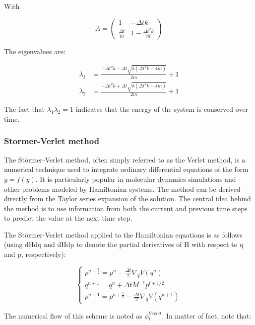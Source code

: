 \documentclass{article}
\begin{document}
With

\[
	A = \begin{pmatrix} 1 & -\Delta t k \\ \frac{\Delta t}{m} & 1 -  \frac{\Delta t^2 k}{m} \end{pmatrix}
\]

The eigenvalues are:

\begin{align*}
	\lambda_1 &= \frac{-\Delta t^2 k - \Delta t \sqrt{k(\Delta t^2 k - 4m)}}{2m} + 1 \\
	\lambda_2 &= \frac{-\Delta t^2 k + \Delta t \sqrt{k(\Delta t^2 k - 4m)}}{2m} + 1
\end{align*}

The fact that \(\lambda_1 \lambda_2 = 1\) indicates that the energy of the system is conserved over time.

\subsubsection{Stormer-Verlet method}
\label{sec:stormer_verlet_method}

The Störmer-Verlet method, often simply referred to as the Verlet method, is a numerical technique used to integrate ordinary differential equations of the form \( \dot{y} = f(y) \). It is particularly popular in molecular dynamics simulations and other problems modeled by Hamiltonian systems. The method can be derived directly from the Taylor series expansion of the solution. The central idea behind the method is to use information from both the current and previous time steps to predict the value at the next time step. 

The Störmer-Verlet method applied to the Hamiltonian equations is as follows (using dHdq and dHdp to denote the partial derivatives of H with respect to q and p, respectively):

\begin{equation}
	\begin{cases}
		p^{n + \frac{1}{2}} = p^n - \frac{\Delta t}{2} \nabla_q V(q^n) \\
		q^{n+1} = q^{n} + \Delta t M^{-1} p^{t+1/2} \\
		p^{n+1} = p^{n+\frac{1}{2}} - \frac{\Delta t}{2} \nabla_q V(q^{n+1})
	\end{cases}
	\label{eq:stormerverlet}
\end{equation}

The numerical flow of this scheme is noted as \(\phi^{Verlet}_t\). In matter of fact, note that:
\end{document}
